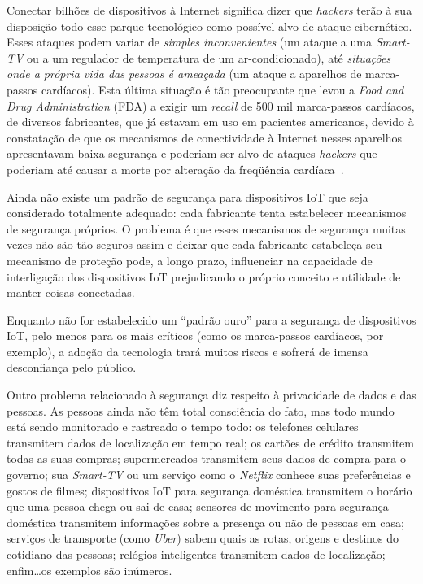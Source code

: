 \documentclass[pdftex, brazil, 12pt, twoside]{article}
\newcommand{\ingles}[1]{\textit{#1}}
\begin{document}
Conectar bilhões de dispositivos à Internet significa dizer que \ingles{hackers}
terão à sua disposição todo esse parque tecnológico como possível alvo de
ataque cibernético. Esses ataques podem variar de \emph{simples inconvenientes} (um
ataque a uma \ingles{Smart-TV} ou a um regulador de temperatura de um ar-condicionado),
até \emph{situações onde a própria vida das pessoas é ameaçada} (um ataque a aparelhos
de marca-passos cardíacos). Esta última situação é tão preocupante que levou a
\ingles{Food and Drug Administration} (FDA) a exigir um \ingles{recall} de 500 mil
marca-passos cardíacos, de diversos fabricantes, que já estavam em uso em pacientes
americanos, devido à constatação de que os mecanismos de conectividade à Internet
nesses aparelhos apresentavam baixa segurança e poderiam ser alvo de ataques
\ingles{hackers} que poderiam até causar a morte por alteração da
freqüência cardíaca~\citep{HernPacemakersIoTRecall2017}.

Ainda não existe um padrão de segurança para dispositivos IoT que seja considerado
totalmente adequado: cada fabricante tenta estabelecer mecanismos de segurança
próprios. O problema é que esses mecanismos de segurança muitas vezes não são
tão seguros assim e deixar que cada fabricante estabeleça seu mecanismo de proteção
pode, a longo prazo, influenciar na capacidade de interligação dos dispositivos IoT
prejudicando o próprio conceito e utilidade de manter coisas conectadas.

Enquanto não for estabelecido um ``padrão ouro'' para a segurança de dispositivos
IoT, pelo menos para os mais críticos (como os marca-passos cardíacos, por
exemplo), a adoção da tecnologia trará muitos riscos e sofrerá de imensa
desconfiança pelo público.

Outro problema relacionado à segurança diz respeito à privacidade de dados e
das pessoas. As pessoas ainda não têm total consciência do fato, mas todo mundo
está sendo monitorado e rastreado o tempo todo: os telefones celulares transmitem
dados de localização em tempo real; os cartões de crédito transmitem todas as
suas compras; supermercados transmitem seus dados de compra para o governo;
sua \ingles{Smart-TV} ou um serviço como o \ingles{Netflix} conhece suas
preferências e gostos de filmes; dispositivos IoT para segurança doméstica
transmitem o horário que uma pessoa chega ou sai de casa; sensores de
movimento para segurança doméstica transmitem informações sobre a presença ou
não de pessoas em casa; serviços de transporte (como \ingles{Uber}) sabem quais
as rotas, origens e destinos do cotidiano das pessoas;
relógios inteligentes transmitem dados de localização;
enfim\ldots os exemplos são inúmeros.
\end{document}
